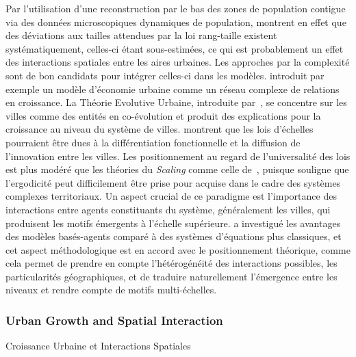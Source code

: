 {Par l'utilisation d'une reconstruction par le bas des zones de population contigue via des données microscopiques dynamiques de population, \cite{rozenfeld2008laws} montrent en effet que des déviations aux tailles attendues par la loi rang-taille existent systématiquement, celles-ci étant sous-estimées, ce qui est probablement un effet des interactions spatiales entre les aires urbaines. Les approches par la complexité sont de bon candidats pour intégrer celles-ci dans les modèles. \cite{andersson2006complex} introduit par exemple un modèle d'économie urbaine comme un réseau complexe de relations en croissance. La Théorie Evolutive Urbaine, introduite par~\cite{pumain1997pour}, se concentre sur les villes comme des entités en co-évolution et produit des explications pour la croissance au niveau du système de villes. \cite{pumain2006evolutionary} montrent que les lois d'échelles pourraient être dues à la différentiation fonctionnelle et la diffusion de l'innovation entre les villes. Les positionnement au regard de l'universalité des lois est plus modéré que les théories du \emph{Scaling} comme celle de~\cite{west2017scaling}, puisque \cite{pumain2012urban} souligne que l'ergodicité peut difficilement être prise pour acquise dans le cadre des systèmes complexes territoriaux. Un aspect crucial de ce paradigme est l'importance des interactions entre agents constituants du système, généralement les villes, qui produisent les motifs émergents à l'échelle supérieure. \cite{pumain2013theoretical} a investigué les avantages des modèles basés-agents comparé à des systèmes d'équations plus classiques, et cet aspect méthodologique est en accord avec le positionnement théorique, comme cela permet de prendre en compte l'hétérogénéité des interactions possibles, les particularités géographiques, et de traduire naturellement l'émergence entre les niveaux et rendre compte de motifs multi-échelles.
}


\subsubsection{Urban Growth and Spatial Interaction}{Croissance Urbaine et Interactions Spatiales}

